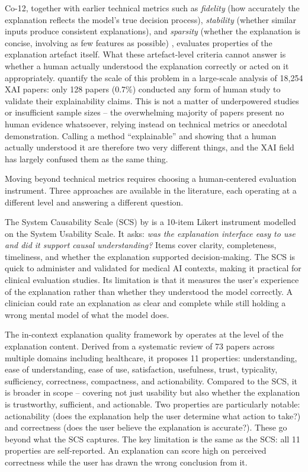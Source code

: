 \documentclass[12pt, a4paper]{article}
\begin{document}
Co-12, together with earlier technical metrics such as
\emph{fidelity} (how accurately the explanation reflects the model's
true decision process), \emph{stability} (whether similar inputs
produce consistent explanations), and \emph{sparsity} (whether
the explanation is concise, involving as few features as possible)
\citep{doshivelez2017rigorous, budhkar2025survey}, evaluates properties
of the explanation artefact itself. What these artefact-level criteria
cannot answer is whether a human actually understood the explanation
correctly or acted on it appropriately. \citet{suh2025fewer} quantify the scale of this problem in a large-scale
analysis of 18,254 XAI papers: only 128 papers (0.7\%) conducted any form
of human study to validate their explainability claims. This is not a
matter of underpowered studies or insufficient sample sizes -- the
overwhelming majority of papers present no human evidence whatsoever,
relying instead on technical metrics or anecdotal demonstration.
Calling a method ``explainable'' and showing that a human actually
understood it are therefore two very different things, and the XAI field
has largely confused them as the same thing.

Moving beyond technical metrics requires choosing a human-centered
evaluation instrument. Three approaches are available in the
literature, each operating at a different level and answering a
different question.

The System Causability Scale (SCS) by \citet{holzinger2020measuring}
is a 10-item Likert instrument modelled on the System Usability Scale.
It asks: \emph{was the explanation interface easy to use and did it
support causal understanding?} Items cover clarity, completeness,
timeliness, and whether the explanation supported decision-making.
The SCS is quick to administer and validated for medical AI contexts,
making it practical for clinical evaluation studies. Its limitation
is that it measures the user's experience of the explanation
rather than whether they understood the model correctly. A clinician
could rate an explanation as clear and complete while still holding
a wrong mental model of what the model does.

The in-context explanation quality framework by
\citet{kim2024human} operates at the level of the explanation
content. Derived from a systematic review of 73 papers across
multiple domains including healthcare, it proposes 11 properties:
understanding, ease of understanding, ease of use, satisfaction,
usefulness, trust, typicality, sufficiency, correctness, compactness,
and actionability. Compared to the SCS, it is broader in scope --
covering not just usability but also whether the explanation is
trustworthy, sufficient, and actionable. Two properties are
particularly notable: actionability (does the explanation
help the user determine what action to take?) and
correctness (does the user believe the explanation is
accurate?). These go beyond what the SCS captures. The key limitation
is the same as the SCS: all 11 properties are self-reported.
An explanation can score high on perceived correctness while the
user has drawn the wrong conclusion from it.
\end{document}
